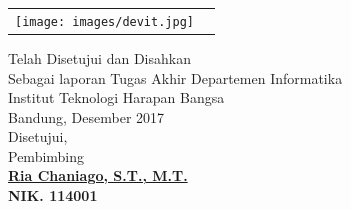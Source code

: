 \begin{center}   
\begin{tabular}{ p{4.5cm}  p{3.5cm}}
 \texttt{[image: images/devit.jpg]} &
\vspace{-4cm}{Disusun oleh:\newline Nama: Devit Lie\newline NIM	: 1114001}

\end{tabular}
\end{center}
\doublespacing
{\center
\vspace{1cm}
Telah Disetujui dan Disahkan\\ Sebagai laporan Tugas Akhir Departemen Informatika\\
Institut Teknologi Harapan Bangsa\\[0.5cm]
Bandung,   Desember 2017\\
Disetujui,\\[0.5cm]
Pembimbing\\[2cm]
\bfseries 
{\underline {Ria Chaniago, S.T., M.T.}\\
NIK. 114001\\}}